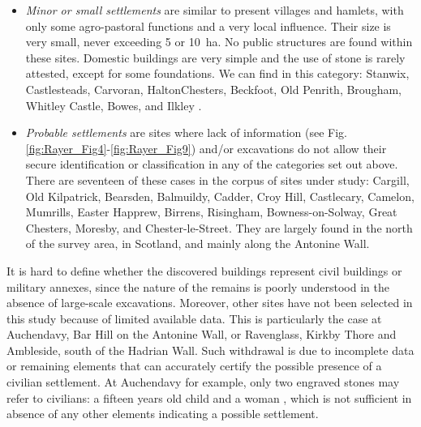 \begin{itemize}
	\item \emph{Minor or small settlements} are similar to present villages and hamlets, with only some agro-pastoral functions and a very local influence. Their size is very small, never exceeding 5 or \SI{10}{\hectare}. No public structures are found within these sites. Domestic buildings are very simple and the use of stone is rarely attested, except for some foundations. We can find in this category: Stanwix, Castlesteads, Carvoran, HaltonChesters, Beckfoot, Old Penrith, Brougham, Whitley Castle, Bowes, and Ilkley \parencites[see for instance][121]{Casey_1998}[124--127]{Hodgson_2009}.
	\item \emph{Probable settlements} are sites where lack of information (see Fig. \ref{fig:Rayer_Fig4}-\ref{fig:Rayer_Fig9}) and/or excavations do not allow their secure identification or classification in any of the categories set out above. There are seventeen of these cases in the corpus of sites under study: Cargill, Old Kilpatrick, Bearsden, Balmuildy, Cadder, Croy Hill, Castlecary, Camelon, Mumrills, Easter Happrew, Birrens, Risingham, Bowness-on-Solway, Great Chesters, Moresby, and Chester-le-Street. They are largely found in the north of the survey area, in Scotland, and mainly along the Antonine Wall. 
\end{itemize}
It is hard to define whether the discovered buildings represent civil buildings or military annexes, since the nature of the remains is poorly understood in the absence of large-scale excavations. Moreover, other sites have not been selected in this study because of limited available data. This is particularly the case at Auchendavy, Bar Hill on the Antonine Wall, or Ravenglass, Kirkby Thore and Ambleside, south of the Hadrian Wall. Such withdrawal is due to incomplete data or remaining elements that can accurately certify the possible presence of a civilian settlement. At Auchendavy for example, only two engraved stones may refer to civilians: a fifteen years old child \parencite[2182]{RIB_1965} and a woman \parencite[2183]{RIB_1965}, which is not sufficient in absence of any other elements indicating a possible settlement.
	

